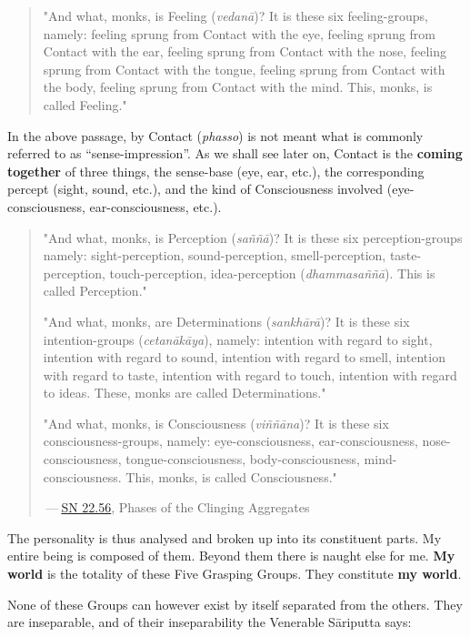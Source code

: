 \begin{quote}
"And what, monks, is Feeling (\emph{vedanā})? It is these six feeling-groups, namely: feeling sprung from Contact with the eye, feeling sprung from Contact with the ear, feeling sprung from Contact with the nose, feeling sprung from Contact with the tongue, feeling sprung from Contact with the body, feeling sprung from Contact with the mind. This, monks, is called Feeling."
\end{quote}

In the above passage, by Contact (\emph{phasso}) is not meant what is commonly referred to as ``sense-impression''. As we shall see later on, Contact is the \textbf{coming together} of three things, the sense-base (eye, ear, etc.), the corresponding percept (sight, sound, etc.), and the kind of Consciousness involved (eye-consciousness, ear-consciousness, etc.).

\begin{quote}
"And what, monks, is Perception (\emph{saññā})? It is these six perception-groups namely: sight-perception, sound-perception, smell-perception, taste-perception, touch-perception, idea-perception (\emph{dhammasaññā}). This is called Perception."

"And what, monks, are Determinations (\emph{sankhārā})? It is these six intention-groups (\emph{cetanākāya}), namely: intention with regard to sight, intention with regard to sound, intention with regard to smell, intention with regard to taste, intention with regard to touch, intention with regard to ideas. These, monks are called Determinations."

"And what, monks, is Consciousness (\emph{viññāna})? It is these six consciousness-groups, namely: eye-consciousness, ear-consciousness, nose-consciousness, tongue-consciousness, body-consciousness, mind-consciousness. This, monks, is called Consciousness."

 --- \href{https://suttacentral.net/sn22.56/en/bodhi}{SN 22.56}, Phases of the Clinging Aggregates
\end{quote}

The personality is thus analysed and broken up into its constituent parts. My entire being is composed of them. Beyond them there is naught else for me. \textbf{My world} is the totality of these Five Grasping Groups. They constitute \textbf{my world}.

None of these Groups can however exist by itself separated from the others. They are inseparable, and of their inseparability the Venerable Sāriputta says:

